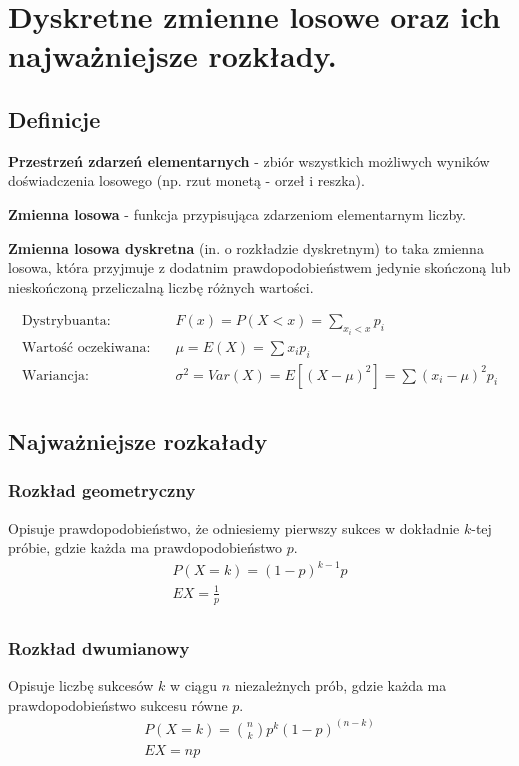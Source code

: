 \section{Dyskretne zmienne losowe oraz ich najważniejsze rozkłady.}

\subsection{Definicje}

\textbf{Przestrzeń zdarzeń elementarnych} - zbiór wszystkich możliwych wyników doświadczenia losowego (np. rzut monetą - orzeł i reszka).

\textbf{Zmienna losowa} - funkcja przypisująca zdarzeniom elementarnym liczby.

\textbf{Zmienna losowa dyskretna} (in. o rozkładzie dyskretnym) to taka zmienna losowa,
która przyjmuje z dodatnim prawdopodobieństwem jedynie skończoną lub nieskończoną przeliczalną liczbę różnych wartości.

\begin{align*}
    \text{Dystrybuanta:} \quad & F(x)=P(X < x)=\sum_{x_i<x}p_i\\
    \text{Wartość oczekiwana:} \quad & \mu = E(X)=\sum x_i p_i\\
    \text{Wariancja:} \quad & \sigma^2 = Var(X)=E\left[ (X - \mu)^2 \right] = \sum (x_i - \mu)^2p_i\\
\end{align*}

\subsection{Najważniejsze rozkałady}

\subsubsection{Rozkład geometryczny}
Opisuje prawdopodobieństwo, że odniesiemy pierwszy sukces w dokładnie $k$-tej próbie,
gdzie każda ma prawdopodobieństwo $p$.
\begin{gather*}
    P(X=k)=(1-p)^{k-1}p\\
    EX=\frac{1}{p}\\
\end{gather*}

\subsubsection{Rozkład dwumianowy}
Opisuje liczbę sukcesów $k$ w ciągu $n$ niezależnych prób, gdzie każda ma prawdopodobieństwo sukcesu równe $p$.
\begin{gather*}
    P(X=k)=\binom{n}{k}p^k(1-p)^{(n-k)}\\
    EX=np\\
\end{gather*}

